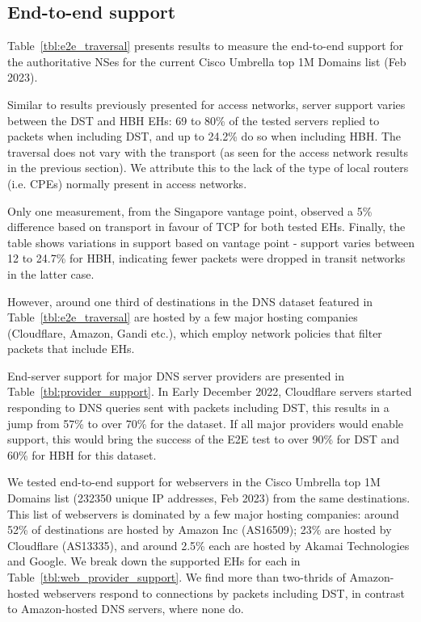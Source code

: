 \documentclass[conference]{IEEEtran}
\begin{document}
\subsection{End-to-end support}
\label{subsec:e2esupport}

Table~\ref{tbl:e2e_traversal} presents results to measure the end-to-end support for the authoritative NSes for the current Cisco Umbrella top 1M Domains list (Feb 2023).

Similar to results previously presented for access networks, server support varies between the DST and HBH EHs: 69 to 80\% of the tested servers replied to packets when including DST, and up to 24.2\% do so when including HBH. The traversal does not vary with the transport (as seen for the access network results in the previous section). We attribute this to the lack of the type of local routers (i.e. CPEs) normally present in access networks. 

Only one measurement, from the Singapore vantage point, observed a 5\% difference based on transport in favour of TCP for both tested EHs.
Finally, the table shows variations in support based on vantage point - support varies between 12 to 24.7\% for HBH, indicating fewer packets were dropped in transit networks in the latter case.

However, around one third of destinations in the DNS dataset featured in Table~\ref{tbl:e2e_traversal} are hosted by a few major hosting companies (Cloudflare, Amazon, Gandi etc.), which employ network policies that filter packets that include EHs. 

End-server support for major DNS server providers are presented in Table~\ref{tbl:provider_support}. In Early December 2022, Cloudflare servers started responding to DNS queries sent with packets including DST, this results in a jump from 57\% to over 70\% for the dataset. If all major providers would enable support, this would bring the success of the E2E test to over 90\% for DST and 60\% for HBH for this dataset.

We tested end-to-end support for webservers in the Cisco Umbrella top 1M Domains list (232350 unique IP addresses, Feb 2023) from the same destinations. This list of webservers is dominated by a few major hosting companies: around 52\% of destinations are hosted by Amazon Inc (AS16509); 23\% are hosted by Cloudflare (AS13335), and around 2.5\% each are hosted by Akamai Technologies and Google. We break down the supported EHs for each in Table~\ref{tbl:web_provider_support}. We find more than two-thrids of Amazon-hosted webservers respond to connections by packets including DST, in contrast to Amazon-hosted DNS servers, where none do. 
\end{document}

